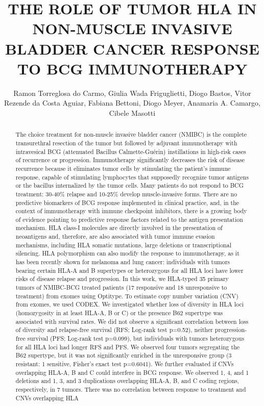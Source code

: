 \documentclass[twoside]{article}
\title{\vspace{-15mm}\fontsize{24pt}{10pt}\selectfont\textbf{ THE ROLE OF TUMOR HLA IN NON-MUSCLE INVASIVE BLADDER CANCER RESPONSE TO BCG IMMUNOTHERAPY }} %
\author{ Ramon Torreglosa do Carmo, Giulia Wada Friguglietti, Diogo Bastos, Vitor Rezende da Costa Aguiar, Fabiana Bettoni, Diogo Meyer, Anamaria A. Camargo, Cibele Masotti }
\affil{  }
\date{}
\begin{document}
  
  
  \maketitle %
  
  
  \thispagestyle{fancy} %
  
  
  \begin{abstract}
  The choice treatment for non-muscle invasive bladder cancer (NMIBC) is the complete transurethral resection of the tumor but followed by adjuvant immunotherapy with intravesical BCG (attenuated Bacillus Calmette-Gu\'erin) instillations in high-risk cases of recurrence or progression. Immunotherapy significantly decreases the risk of disease recurrence because it eliminates tumor cells by stimulating the patient's immune response,  capable of stimulating lymphocytes that supposedly recognize tumor antigens or the bacillus internalized by the tumor cells. Many patients do not respond to BCG treatment: 30-40\% relapse and 10-25\% develop muscle-invasive forms. There are no predictive biomarkers of BCG response implemented in clinical practice,  and,  in the context of immunotherapy with immune checkpoint inhibitors,  there is a growing body of evidence pointing to predictive response factors related to the antigen presentation mechanism. HLA class-I molecules are directly involved in the presentation of neoantigens and,  therefore,  are also associated with tumor immune evasion mechanisms,  including HLA somatic mutations,  large deletions or transcriptional silencing. HLA polymorphism can also modify the response to immunotherapy,  as it has been recently shown for melanoma and lung cancer: individuals with tumors bearing certain HLA-A and B supertypes or heterozygous for all HLA loci have lower risks of disease relapse and progression. In this work,  we HLA-typed 35 primary tumors of NMIBC-BCG treated patients (17 responsive and 18 unresponsive to treatment) from exomes using Optitype. To estimate copy number variation (CNV) from exomes,  we used CODEX. We investigated whether loss of diversity in HLA loci (homozygosity in at least HLA-A,  B or C) or the presence B62 supertype was associated with survival rates. We did not observe a significant correlation between loss of diversity and relapse-free survival (RFS; Log-rank test p=0.52),  neither progression-free survival (PFS; Log-rank test p=0.099),  but individuals with tumors heterozygous for all HLA loci had longer RFS and PFS. We observed four tumors segregating the B62 supertype,  but it was not significantly enriched in the unresponsive group (3 resistant: 1 sensitive,  Fisher’s exact test p=0.6041).  We further evaluated if CNVs overlapping HLA-A,  B and C could interfere in BCG response. We observed 1,  4,  and 1 deletions and 1,  3,  and 3 duplications overlapping HLA-A,  B,  and C coding regions,  respectively,  in 7 tumors. There was no correlation between response to treatment and CNVs overlapping HLA 
\end{abstract}
\end{document}
